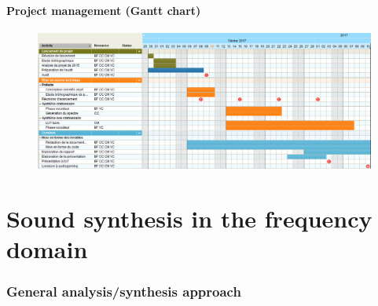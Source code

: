 \documentclass[]{article}
\begin{document}
\subsection{Project management (Gantt chart)}
\begin{figure}[H]
	\includegraphics[scale=0.28]{Gantt.png}
\end{figure}

\newpage
\part{Sound synthesis in the frequency domain}
\section{General analysis/synthesis approach}\label{part:general-approach}
\end{document}

